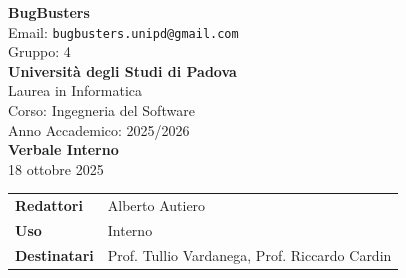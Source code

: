\documentclass[a4paper,12pt]{article}
\begin{document}
\begin{center}
  
  {\Large\bfseries\color{primaryblue} BugBusters}\\[0.3cm]
  {\small\color{darkgray} Email: \texttt{bugbusters.unipd@gmail.com}} \\[0.1cm]
  {\small\color{darkgray} Gruppo: 4} \\[0.5cm]

  {\large\bfseries Università degli Studi di Padova}\\[0.3cm]
  {\small Laurea in Informatica}\\[0.2cm]
  {\small Corso: Ingegneria del Software}\\[0.2cm]
  {\small Anno Accademico: 2025/2026}\\[0.8cm]

  {\Huge\bfseries\color{primaryblue} Verbale Interno}\\[0.3cm]
  {\Large\color{secondaryblue} 18 ottobre 2025}\\[0.8cm]
\end{center}

\begin{center}
\begin{tcolorbox}[colback=lightgray,colframe=primaryblue,width=0.85\textwidth,arc=3mm,boxrule=0.5pt]
\begin{tabular}{@{}ll@{}}
\textbf{Redattori}    & Alberto Autiero \\
\textbf{Uso}          & Interno \\
\textbf{Destinatari}  & Prof. Tullio Vardanega, Prof. Riccardo Cardin \\
\end{tabular}
\end{tcolorbox}
\end{center}

\vspace{0.5cm}
\end{document}
